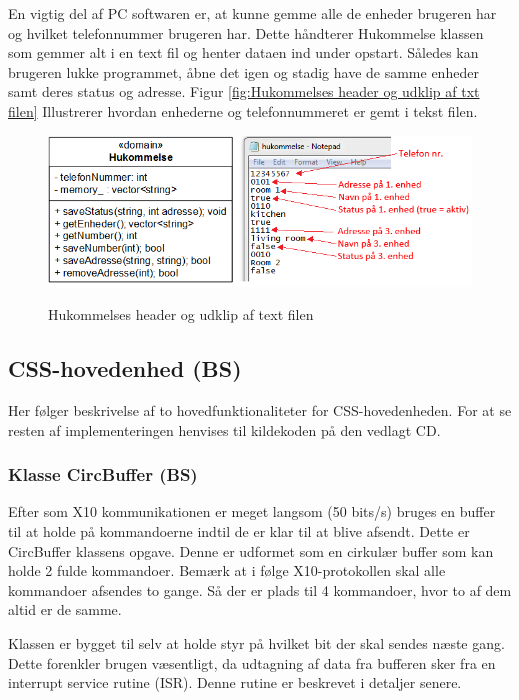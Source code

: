 \clearpage

En vigtig del af PC softwaren er, at kunne gemme alle de enheder brugeren har og hvilket telefonnummer brugeren har. Dette håndterer Hukommelse klassen som gemmer alt i en text fil og henter dataen ind under opstart. Således kan brugeren lukke programmet, åbne det igen og stadig have de samme enheder samt deres status og adresse. Figur \ref{fig:Hukommelses header og udklip af txt filen} Illustrerer hvordan enhederne og telefonnummeret er gemt i tekst filen.

\begin{figure}[htbp] \centering
{\includegraphics[width=\textwidth]{billeder/uml/pc_dataview}}
\caption{Hukommelses header og udklip af text filen}
\label{fig:Hukommelses header og udklip af text filen}
\end{figure}

\subsection{CSS-hovedenhed (BS)}
Her følger beskrivelse af to hovedfunktionaliteter for CSS-hovedenheden. For at se resten af implementeringen henvises til kildekoden på den vedlagt CD.

\subsubsection{Klasse CircBuffer (BS)}
Efter som X10 kommunikationen er meget langsom (50 bits/s) bruges en buffer til at holde på kommandoerne indtil de er klar til at blive afsendt. Dette er CircBuffer klassens opgave.
Denne er udformet som en cirkulær buffer som kan holde 2 fulde kommandoer. Bemærk at i følge X10-protokollen skal alle kommandoer afsendes to gange. Så der er plads til 4 kommandoer, hvor to af dem altid er de samme.

Klassen er bygget til selv at holde styr på hvilket bit der skal sendes næste gang. Dette forenkler brugen væsentligt, da udtagning af data fra bufferen sker fra en interrupt service rutine (ISR). Denne rutine er beskrevet i detaljer senere.

